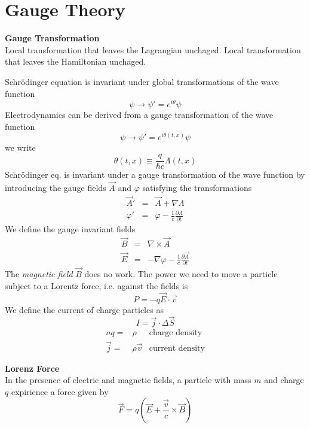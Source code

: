 \documentclass[12pt,a4paper]{article}
\author{José Antonio}
\begin{document}
\section{Gauge Theory}
\textbf{Gauge Transformation}\\
Local transformation that leaves the Lagrangian unchaged.
Local transformation that leaves the Hamiltonian unchaged.


Schrödinger equation is invariant under global transformations of the wave function
\begin{equation}
	\psi \rightarrow \psi'=e^{i\theta}\psi
\end{equation}
Electrodynamics can be derived from a gauge transformation of the wave function
\begin{equation}
	\psi \rightarrow \psi'=e^{i\theta(t,x)}\psi
\end{equation}
we write
\begin{equation}
	\theta(t,x) \equiv \frac{q}{\hbar c}\Lambda(t,x)
\end{equation}
Schrödinger eq. is invariant under a gauge transformation of the wave function by introducing the gauge fields $\vec{A}$ and $\varphi$ satisfying the transformations
\begin{eqnarray}
	\vec{A}' & = & \vec{A} + \nabla \Lambda \\
	\varphi' & = & \varphi - \frac{1}{c}\frac{\partial \Lambda}{\partial t}
\end{eqnarray}
We define the gauge invariant fields
\begin{eqnarray}
	\vec{B} & = & \nabla \times \vec{A} \\
	\vec{E} & = & - \nabla \varphi  - \frac{1}{c}\frac{\partial \vec{A}}{\partial t}
\end{eqnarray}
The \textit{magnetic field} $\vec{B}$ does no work. The power we need to move a particle subject to a Lorentz force, i.e. against the fields is
\begin{equation}
	P = -q\vec{E}\cdot \vec{v}
\end{equation}
We define the current of charge particles as
\begin{equation}
	I = \vec{j}\cdot \Delta \vec{S}
\end{equation}
\begin{eqnarray}
	 nq  = & \rho &  \text{charge density}\\\vec{j}  = & \rho \vec{v}  &  \text{current density}
\end{eqnarray}


\textbf{Lorenz Force}\\
In the presence of electric and magnetic fields, a particle with mass $m$ and charge $q$ expirience a force given by
\begin{equation}
	\vec{F} = q(\vec{E} + \frac{\vec{v}}{c}\times \vec{B})
\end{equation}
\end{document}
